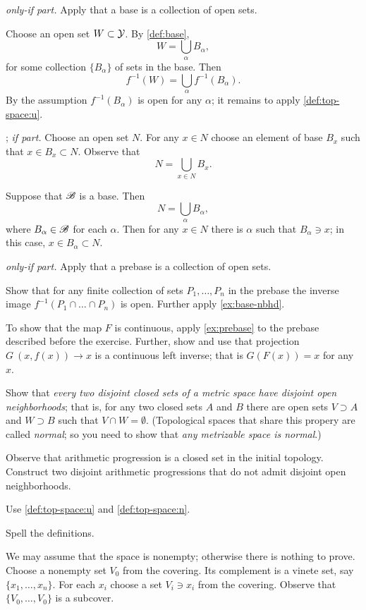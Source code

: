 \begin{multicols}{2}
\parbf{\ref{ex:base};} \textit{only-if part.}
Apply that a base is a collection of open sets.

Choose an open set $W\subset\mathcal{Y}$.
By \ref{def:base}, 
\[W=\bigcup_\alpha B_\alpha,\]
for some collection $\{B_\alpha\}$ of sets in the base.
Then 
\[f^{-1}(W)=\bigcup_\alpha f^{-1}(B_\alpha).\]
By the assumption $f^{-1}(B_\alpha)$ is open for any $\alpha$;
it remains to apply \ref{def:top-space:u}.

\parbf{\ref{ex:base-nbhd}}; \textit{if part.} 
Choose an open set $N$.
For any $x\in N$ choose an element of base $B_x$ such that $x\in B_x\subset N$.
Observe that 
\[N=\bigcup_{x\in N}B_x.\]

 Suppose that $\mathscr{B}$ is a base.
Then 
\[N=\bigcup_{\alpha}B_\alpha,\]
where $B_\alpha\in \mathscr{B}$ for each $\alpha$.
Then for any $x\in N$ there is $\alpha$ such that $B_\alpha\ni x$;
in this case, $x\in B_\alpha\subset N$.

\parbf{\ref{ex:prebase};} \textit{only-if part.}
Apply that a prebase is a collection of open sets.

 Show that for any finite collection of sets $P_1,\dots,P_n$ in the prebase the inverse image 
$f^{-1}(P_1\cap\dots\cap P_n)$
is open.
Further apply \ref{ex:base-nbhd}.

 To show that the map $F$ is continuous,
apply \ref{ex:prebase} to the prebase described before the exercise.
Further, show and use that projection $G\:(x,f(x))\to x$ is a continuous left inverse;
that is $G(F(x))=x$ for any $x$.

Show that \textit{every two disjoint closed sets of a metric space have disjoint open neighborhoods};
that is, for any two closed sets $A$ and $B$ there are open sets $V\supset A$ and $W\supset B$ such that $V\cap W=\emptyset$.
(Topological spaces that share this propery are called \emph{normal};
so you need to show that \textit{any metrizable space is normal}.)

Observe that arithmetic progression is a closed set in the initial topology.
Construct two disjoint arithmetic progressions that do not admit disjoint open neighborhoods. 

Use \ref{def:top-space:u} and \ref{def:top-space:n}.

Spell the definitions.

We may assume that the space is nonempty; otherwise there is nothing to prove.
Choose a nonempty set $V_0$ from the covering.
Its complement is a vinete set, say $\{x_1,\dots,x_n\}$.
For each $x_i$ choose a set $V_i\ni x_i$ from the covering.
Observe that $\{V_0,\dots,V_0\}$ is a subcover.


\end{multicols}

